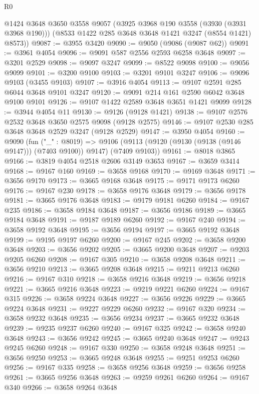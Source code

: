 \begin{lexlean}{R0}
\begin{coremodule}
      @1424
      @3648
      @3650
      @3558
      @9057
      (@3925 @3968 @190 @3558 (@3930 (@3931 @3968 @190)))
      (@8533 @1422 @285 @3648 @3648 @1421 @3247 (@8554 @1421) @8573))
@9087 := @3955 @3420
@9090 := @9050 (@9086 (@9087 @62))
@9091 := @3961 @4054
@9096 := @9091 @587 @2556 @2593 @6258 @3648
@9097 := @3201 @2529
@9098 := @9097 @3247
@9099 := @8522 @9098
@9100 := @9056 @9099
@9101 := @3200 @9100
@9103 := @3201 @9101 @3247
@9106 := @9096 @9103 (@3455 @9103)
@9107 := @3916 @4054
@9113 := @9107 @2591 @285 @6044 @3648 @9101 @3247
@9120 := @9091 @214 @161 @2590 @6042 @3648 @9100 @9101
@9126 := @9107 @1422 @2589 @3648 @3651 @1421 @9099
@9128 := @3944 @4054 @11
@9130 := @9126 (@9128 @1421)
@9138 := @9107 @2576 @2532 @3648 @3650 @2575 @9098 (@9128 @2575)
@9146 := @9107 @2530 @285 @3648 @3648 @2529 @3247 (@9128 @2529)
@9147 := @3950 @4054
@9160 := @9090
    (fun ("_" : @8019) =>
    @9106 (@9113 (@9120 (@9130 (@9138 (@9146 @9147))) (@7403 @9100)) @9147) (@7409 @9103))
@9161 := @8018 @3865
@9166 := @3819 @4054 @2518 @2606 @3149 @3653
@9167 := @3659 @3414
@9168 := @9167 @160
@9169 := @3658 @9168
@9170 := @9169 @3648
@9171 := @3656 @9170
@9173 := @3665 @9168 @3648
@9175 := @9171 @9173 @6260
@9176 := @9167 @230
@9178 := @3658 @9176 @3648
@9179 := @3656 @9178
@9181 := @3665 @9176 @3648
@9183 := @9179 @9181 @6260
@9184 := @9167 @235
@9186 := @3658 @9184 @3648
@9187 := @3656 @9186
@9189 := @3665 @9184 @3648
@9191 := @9187 @9189 @6260
@9192 := @9167 @240
@9194 := @3658 @9192 @3648
@9195 := @3656 @9194
@9197 := @3665 @9192 @3648
@9199 := @9195 @9197 @6260
@9200 := @9167 @245
@9202 := @3658 @9200 @3648
@9203 := @3656 @9202
@9205 := @3665 @9200 @3648
@9207 := @9203 @9205 @6260
@9208 := @9167 @305
@9210 := @3658 @9208 @3648
@9211 := @3656 @9210
@9213 := @3665 @9208 @3648
@9215 := @9211 @9213 @6260
@9216 := @9167 @310
@9218 := @3658 @9216 @3648
@9219 := @3656 @9218
@9221 := @3665 @9216 @3648
@9223 := @9219 @9221 @6260
@9224 := @9167 @315
@9226 := @3658 @9224 @3648
@9227 := @3656 @9226
@9229 := @3665 @9224 @3648
@9231 := @9227 @9229 @6260
@9232 := @9167 @320
@9234 := @3658 @9232 @3648
@9235 := @3656 @9234
@9237 := @3665 @9232 @3648
@9239 := @9235 @9237 @6260
@9240 := @9167 @325
@9242 := @3658 @9240 @3648
@9243 := @3656 @9242
@9245 := @3665 @9240 @3648
@9247 := @9243 @9245 @6260
@9248 := @9167 @330
@9250 := @3658 @9248 @3648
@9251 := @3656 @9250
@9253 := @3665 @9248 @3648
@9255 := @9251 @9253 @6260
@9256 := @9167 @335
@9258 := @3658 @9256 @3648
@9259 := @3656 @9258
@9261 := @3665 @9256 @3648
@9263 := @9259 @9261 @6260
@9264 := @9167 @340
@9266 := @3658 @9264 @3648

\end{coremodule}
\end{lexlean}
